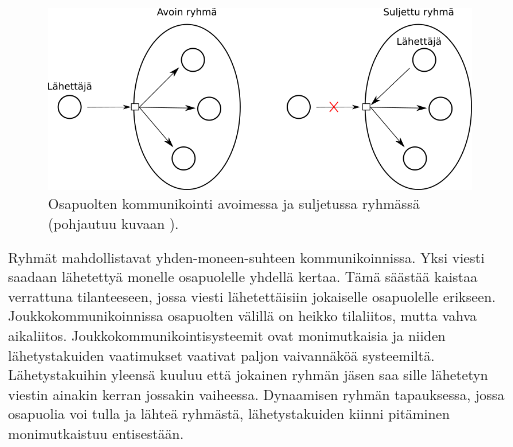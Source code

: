 \begin{figure}[ht!]
	\includegraphics[width=1\textwidth]{pictures/group-communication.png}
	\caption{Osapuolten kommunikointi avoimessa ja suljetussa ryhmässä (pohjautuu kuvaan \mbox{\cite[s.~235]{distributed-systems-concepts-and-design}}).}
	\label{fig:group-communication}
\end{figure}

Ryhmät mahdollistavat yhden-moneen-suhteen kommunikoinnissa. Yksi viesti saadaan lähetettyä monelle osapuolelle yhdellä kertaa. Tämä säästää kaistaa verrattuna tilanteeseen, jossa viesti lähetettäisiin jokaiselle osapuolelle erikseen. Joukkokommunikoinnissa osapuolten välillä on heikko tilaliitos, mutta vahva aikaliitos. Joukkokommunikointisysteemit ovat monimutkaisia ja niiden lähetystakuiden vaatimukset vaativat paljon vaivannäköä systeemiltä. Lähetystakuihin yleensä kuuluu että jokainen ryhmän jäsen saa sille lähetetyn viestin ainakin kerran jossakin vaiheessa. Dynaamisen ryhmän tapauksessa, jossa osapuolia voi tulla ja lähteä ryhmästä, lähetystakuiden kiinni pitäminen monimutkaistuu entisestään. \mbox{\cite{group-communication-specification}} \mbox{\cite[s.~236]{distributed-systems-concepts-and-design}}


